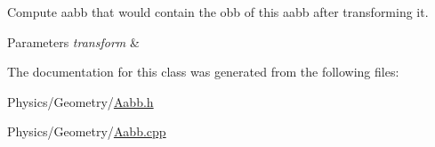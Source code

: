 Compute aabb that would contain the obb of this aabb after transforming it. 


\begin{DoxyParams}{Parameters}
{\em transform} & \\
\hline
\end{DoxyParams}


The documentation for this class was generated from the following files\+:\begin{DoxyCompactItemize}
\item 
Physics/\+Geometry/\hyperlink{Aabb_8h}{Aabb.\+h}\item 
Physics/\+Geometry/\hyperlink{Aabb_8cpp}{Aabb.\+cpp}\end{DoxyCompactItemize}
